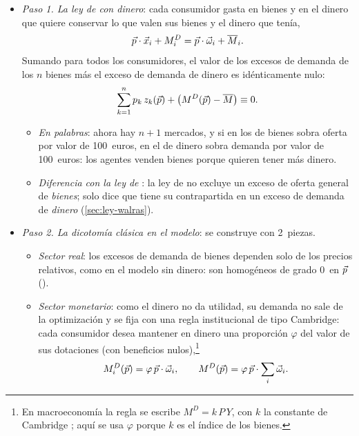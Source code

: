 \documentclass[11pt]{article}
\begin{document}
\begin{itemize}
\item \emph{Paso 1. La ley de  con dinero}: cada consumidor gasta en bienes y en el dinero que quiere conservar lo que valen sus bienes y el dinero que tenía,
  \begin{equation}
  \vec{p}\cdot\vec{x}_i+M^D_i=\vec{p}\cdot\vec{\omega}_i+\overline{M}_i .
  \end{equation}
  Sumando para todos los consumidores, el valor de los excesos de demanda de los $n$ bienes más el exceso de demanda de dinero es idénticamente nulo:
  \begin{equation}
  \sum_{k=1}^{n}p_k\,z_k(\vec{p})+\big(M^D(\vec{p})-\overline{M}\big)\equiv 0. \label{eq:walras-dinero}
  \end{equation}
  \begin{itemize}
  \item \emph{En palabras}: ahora hay $n+1$ mercados, y si en los de bienes sobra oferta por valor de 100~euros, en el de dinero sobra demanda por valor de 100~euros: los agentes venden bienes porque quieren tener más dinero.
  \item \emph{Diferencia con la ley de }: la ley de  no excluye un exceso de oferta general de \emph{bienes}; solo dice que tiene su contrapartida en un exceso de demanda de \emph{dinero} (\ref{sec:ley-walras}).
  \end{itemize}
\item \emph{Paso 2. La dicotomía clásica en el modelo}: se construye con 2~piezas.
  \begin{itemize}
  \item \emph{Sector real}: los excesos de demanda de bienes dependen solo de los precios relativos, como en el modelo sin dinero: son homogéneos de grado 0~en $\vec{p}$ ().
  \item \emph{Sector monetario}: como el dinero no da utilidad, su demanda no sale de la optimización y se fija con una regla institucional de tipo Cambridge: cada consumidor desea mantener en dinero una proporción $\varphi$ del valor de sus dotaciones (con beneficios nulos),\footnote{En macroeconomía la regla se escribe $M^D=k\,P\,Y$, con $k$ la constante de Cambridge ; aquí se usa $\varphi$ porque $k$ es el índice de los bienes.}
    \begin{equation}
    M^D_i(\vect{p})=\varphi\,\vect{p}\cdot\vect{\omega}_i,\qquad M^D(\vect{p})=\varphi\,\vect{p}\cdot\sum_i\vect{\omega}_i .

\end{equation}
\end{itemize}
\end{itemize}
\end{document}
